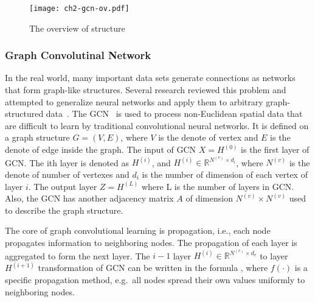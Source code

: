 \begin{figure}[htbp!]
    \centering
    \texttt{[image: ch2-gcn-ov.pdf]}
    \caption{The overview of structure}\label{fig:ch2-gcn-ov}
\end{figure}



\subsubsection{Graph Convolutinal Network}

In the real world, many important data sets generate connections as networks that form graph-like structures. Several research reviewed this problem and attempted to generalize neural networks and apply them to arbitrary graph-structured data~\cite{wu2018socialgcn, dettmers2018convolutional}. The GCN~\cite{kipf2017semi} is used to process non-Euclidean spatial data that are difficult to learn by traditional convolutional neural networks. It is defined on a graph structure \(G=(V, E)\), where \(V\) is the denote of vertex and \(E\) is the denote of edge inside the graph. The input of GCN \(X = H^{(0)}\) is the first layer of GCN. The ith layer is denoted as \(H^{(i)}\), and \(H^{(i)}\in \mathbb{R}^{N^{(v)}\times d_{i}}\), where \(N^{(v)}\) is the denote of number of vertexes and \(d_{i}\) is the number of dimension of each vertex of layer \(i\). The output layer \(Z = H^{(L)}\) where L is the number of layers in GCN\@. Also, the GCN has another adjacency matrix \(A\) of dimension \(N^{(v)}\times N^{(v)}\) used to describe the graph structure.

The core of graph convolutional learning is propagation, i.e., each node propagates information to neighboring nodes. The propagation of each layer is aggregated to form the next layer. The \(i-1\) layer \(H^{(i)}\in \mathbb{R}^{N^{(v)}\times d_v}\) to layer \(H^{(i+1)}\) transformation of GCN can be written in the formula \eqname{\ref{fml:ch2-gcnlayer}}, where \(f(\cdot)\) is a specific propagation method, e.g.\ all nodes spread their own values uniformly to neighboring nodes.

